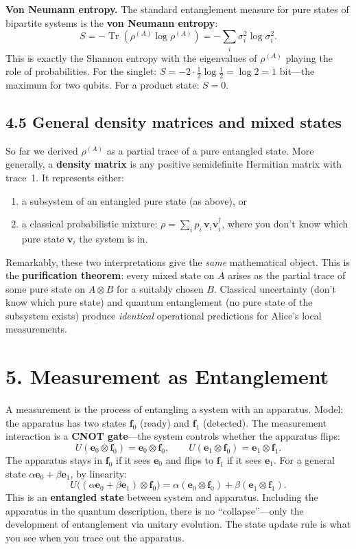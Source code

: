 \documentclass[12pt,a4paper]{article}
\begin{document}
\medskip
\noindent\textbf{Von Neumann entropy.}  The standard entanglement measure for pure states of bipartite systems is the \textbf{von Neumann entropy}:
\[
    S = -\operatorname{Tr}(\rho^{(A)}\log\rho^{(A)}) = -\sum_i \sigma_i^2\log\sigma_i^2.
\]
This is exactly the Shannon entropy with the eigenvalues of $\rho^{(A)}$ playing the role of probabilities.  For the singlet: $S = -2\cdot\frac{1}{2}\log\frac{1}{2} = \log 2 = 1$ bit---the maximum for two qubits.  For a product state: $S=0$.

\subsection{4.5 General density matrices and mixed states}
So far we derived $\rho^{(A)}$ as a partial trace of a pure entangled state.  More generally, a \textbf{density matrix} is any positive semidefinite Hermitian matrix with trace~1.  It represents either:
\begin{enumerate}[nosep]
    \item[(a)] a subsystem of an entangled pure state (as above), or
    \item[(b)] a classical probabilistic mixture: $\rho = \sum_i p_i\,\mathbf{v}_i\mathbf{v}_i^\dagger$, where you don't know which pure state $\mathbf{v}_i$ the system is in.
\end{enumerate}
Remarkably, these two interpretations give the \emph{same} mathematical object.  This is the \textbf{purification theorem}: every mixed state on $A$ arises as the partial trace of some pure state on $A\otimes B$ for a suitably chosen $B$.  Classical uncertainty (don't know which pure state) and quantum entanglement (no pure state of the subsystem exists) produce \emph{identical} operational predictions for Alice's local measurements.

\section{5. Measurement as Entanglement}

A measurement is the process of entangling a system with an apparatus.  Model: the apparatus has two states $\mathbf{f}_0$ (ready) and $\mathbf{f}_1$ (detected).  The measurement interaction is a \textbf{CNOT gate}---the system controls whether the apparatus flips:
\[
    U(\mathbf{e}_0\otimes\mathbf{f}_0) = \mathbf{e}_0\otimes\mathbf{f}_0, \qquad
    U(\mathbf{e}_1\otimes\mathbf{f}_0) = \mathbf{e}_1\otimes\mathbf{f}_1.
\]
The apparatus stays in $\mathbf{f}_0$ if it sees $\mathbf{e}_0$ and flips to $\mathbf{f}_1$ if it sees $\mathbf{e}_1$.  For a general state $\alpha\mathbf{e}_0+\beta\mathbf{e}_1$, by linearity:
\[
    U\bigl((\alpha\mathbf{e}_0+\beta\mathbf{e}_1)\otimes\mathbf{f}_0\bigr) = \alpha(\mathbf{e}_0\otimes\mathbf{f}_0) + \beta(\mathbf{e}_1\otimes\mathbf{f}_1).
\]
This is an \textbf{entangled state} between system and apparatus.  Including the apparatus in the quantum description, there is no ``collapse''---only the development of entanglement via unitary evolution.  The state update rule is what you see when you trace out the apparatus.
\end{document}
